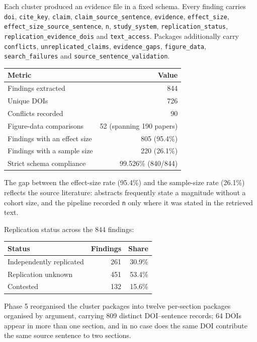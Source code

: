 \documentclass[11pt]{article}
\begin{document}
Each cluster produced an evidence file in a fixed schema. Every finding carries \texttt{doi}, \texttt{cite\_key}, \texttt{claim}, \texttt{claim\_source\_sentence}, \texttt{evidence}, \texttt{effect\_size}, \texttt{effect\_size\_source\_sentence}, \texttt{n}, \texttt{study\_system}, \texttt{replication\_status}, \texttt{replication\_evidence\_dois} and \texttt{text\_access}. Packages additionally carry \texttt{conflicts}, \texttt{unreplicated\_claims}, \texttt{evidence\_gaps}, \texttt{figure\_data}, \texttt{search\_failures} and \texttt{source\_sentence\_validation}.

\begin{table}[H]
\centering
\small
\begin{tabular}{lr}
\toprule
\textbf{Metric} & \textbf{Value} \\
\midrule
Findings extracted & 844 \\
Unique DOIs & 726 \\
Conflicts recorded & 90 \\
Figure-data comparisons & 52 (spanning 190 papers) \\
Findings with an effect size & 805 (95.4\%) \\
Findings with a sample size & 220 (26.1\%) \\
Strict schema compliance & 99.526\% (840/844) \\
\bottomrule
\end{tabular}
\end{table}

The gap between the effect-size rate (95.4\%) and the sample-size rate (26.1\%) reflects the source literature: abstracts frequently state a magnitude without a cohort size, and the pipeline recorded \texttt{n} only where it was stated in the retrieved text.

Replication status across the 844 findings:

\begin{table}[H]
\centering
\small
\begin{tabular}{lrr}
\toprule
\textbf{Status} & \textbf{Findings} & \textbf{Share} \\
\midrule
Independently replicated & 261 & 30.9\% \\
Replication unknown & 451 & 53.4\% \\
Contested & 132 & 15.6\% \\
\bottomrule
\end{tabular}
\end{table}

Phase 5 reorganised the cluster packages into twelve per-section packages organised by argument, carrying 809 distinct DOI--sentence records; 64 DOIs appear in more than one section, and in no case does the same DOI contribute the same source sentence to two sections.
\end{document}

